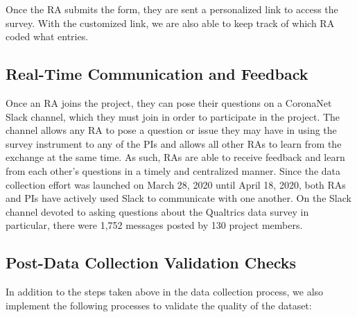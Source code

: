 \documentclass[]{article}
\begin{document}
Once the RA submits the form, they are sent a personalized link to access the survey. With the customized link, we are also able to keep track of which RA coded what entries.

\hypertarget{real-time-communication-and-feedback}{%
\subsection{Real-Time Communication and Feedback}\label{real-time-communication-and-feedback}}

Once an RA joins the project, they can pose their questions on a CoronaNet Slack channel, which they must join in order to participate in the project. The channel allows any RA to pose a question or issue they may have in using the survey instrument to any of the PIs and allows all other RAs to learn from the exchange at the same time. As such, RAs are able to receive feedback and learn from each other's questions in a timely and centralized manner. Since the data collection effort was launched on March 28, 2020 until April 18, 2020, both RAs and PIs have actively used Slack to communicate with one another. On the Slack channel devoted to asking questions about the Qualtrics data survey in particular, there were 1,752 messages posted by 130 project members.

\hypertarget{post-data-collection-validation-checks}{%
\subsection{Post-Data Collection Validation Checks}\label{post-data-collection-validation-checks}}

In addition to the steps taken above in the data collection process, we also implement the following processes to validate the quality of the dataset:
\end{document}

